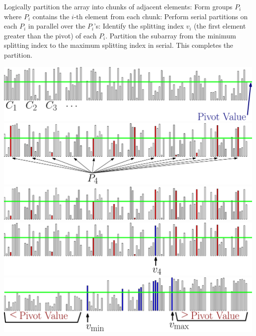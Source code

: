 \documentclass[xcolor=x11names, svgnames, rgb]{beamer}
\begin{document}
\begin{frame}[t]{}%
	\vspace{0.25cm}
	\begin{overprint}
	Logically partition the array into chunks of adjacent elements:
	\onslide<2>Form groups $P_i$ where $P_i$ contains the $i$-th element from each chunk:
	\onslide<3>Perform serial partitions on each $P_i$ in parallel over the $P_i$'s:
	\onslide<5>Identify the splitting index $v_i$ (the first element greater than the pivot) of each $P_i$. 
	\onslide<7>Partition the subarray from the minimum splitting index to the maximum splitting index in serial. This completes the partition. 
	\end{overprint}
	\vspace{0.25cm}
	\begin{overprint}
	\includegraphics[width=\linewidth]{imgs/stridedAlgSim/stridedAlgSim_1.eps}
	\onslide<2>\includegraphics[width=\linewidth]{imgs/stridedAlgSim/stridedAlgSim_2.eps}
	\onslide<3>\includegraphics[width=\linewidth]{imgs/stridedAlgSim/stridedAlgSim_3.eps}
	\onslide<4>\includegraphics[width=\linewidth]{imgs/stridedAlgSim/stridedAlgSim_35.eps}
	\onslide<5>\includegraphics[width=\linewidth]{imgs/stridedAlgSim/stridedAlgSim_4.eps}

\end{overprint}
\end{frame}
\end{document}
